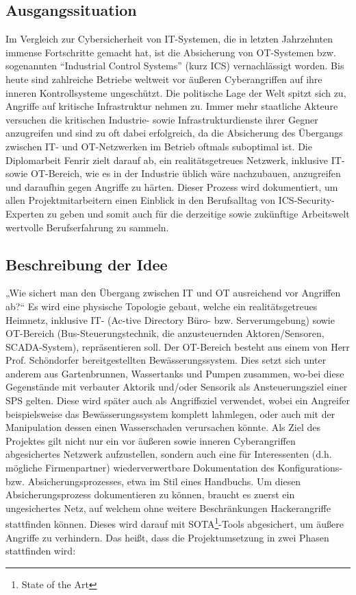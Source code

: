 \documentclass[
	headings=optiontotocandhead,%
	oneside,
	numbers=noenddot,%
	toc=flat, %
	10pt, %
	parskip=full, %
	listof=totoc, %
	listof=flat, %
	numbers=noenddot, %
	bibliography=totoc, %
	a4paper,DIV=14,
]{scrartcl}
\begin{document}
\subsection{Ausgangssituation}
Im Vergleich zur Cybersicherheit von IT-Systemen, die in letzten Jahrzehnten immense Fortschritte gemacht hat, ist die Absicherung von OT-Systemen bzw. sogenannten “Industrial Control Systems” (kurz ICS) vernachlässigt worden. Bis heute sind zahlreiche Betriebe weltweit vor äußeren Cyberangriffen auf ihre inneren Kontrollsysteme ungeschützt.
Die politische Lage der Welt spitzt sich zu, Angriffe auf kritische Infrastruktur nehmen zu. Immer mehr staatliche Akteure versuchen die kritischen Industrie- sowie Infrastrukturdienste ihrer Gegner anzugreifen und sind zu oft dabei erfolgreich, da die Absicherung des Übergangs zwischen IT- und OT-Netzwerken im Betrieb oftmals suboptimal ist. 
Die Diplomarbeit Fenrir zielt darauf ab, ein realitätsgetreues Netzwerk, inklusive IT- sowie OT-Bereich, wie es in der Industrie üblich wäre nachzubauen, anzugreifen und daraufhin gegen Angriffe zu härten. Dieser Prozess wird dokumentiert, um allen Projektmitarbeitern einen Einblick in den Berufsalltag von ICS-Security-Experten zu geben und somit auch für die derzeitige sowie zukünftige Arbeitswelt wertvolle Berufserfahrung zu sammeln.

\subsection{Beschreibung der Idee}
„Wie sichert man den Übergang zwischen IT und OT ausreichend vor Angriffen ab?“
Es wird eine physische Topologie gebaut, welche ein realitätsgetreues Heimnetz, inklusive IT- (Ac-tive Directory Büro- bzw. Serverumgebung) sowie OT-Bereich (Bus-Steuerungstechnik, die anzusteuernden Aktoren/Sensoren, SCADA-System), repräsentieren soll.
Der OT-Bereich besteht aus einem von Herr Prof. Schöndorfer bereitgestellten Bewässerungssystem. Dies setzt sich unter anderem aus Gartenbrunnen, Wassertanks und Pumpen zusammen, wo-bei diese Gegenstände mit verbauter Aktorik und/oder Sensorik als Ansteuerungsziel einer SPS gelten. Diese wird später auch als Angriffsziel verwendet, wobei ein Angreifer beispielsweise das Bewässerungssystem komplett lahmlegen, oder auch mit der Manipulation dessen einen Wasserschaden verursachen könnte.
Als Ziel des Projektes gilt nicht nur ein vor äußeren sowie inneren Cyberangriffen abgesichertes Netzwerk aufzustellen, sondern auch eine für Interessenten (d.h. mögliche Firmenpartner) wiederverwertbare Dokumentation des Konfigurations- bzw. Absicherungsprozesses, etwa im Stil eines Handbuchs.
Um diesen Absicherungsprozess dokumentieren zu können, braucht es zuerst ein ungesichertes Netz, auf welchem ohne weitere Beschränkungen Hackerangriffe stattfinden können. Dieses wird darauf mit SOTA\footnote{State of the Art}-Tools abgesichert, um äußere Angriffe zu verhindern. Das heißt, dass die Projektumsetzung in zwei Phasen stattfinden wird: \\
\end{document}
